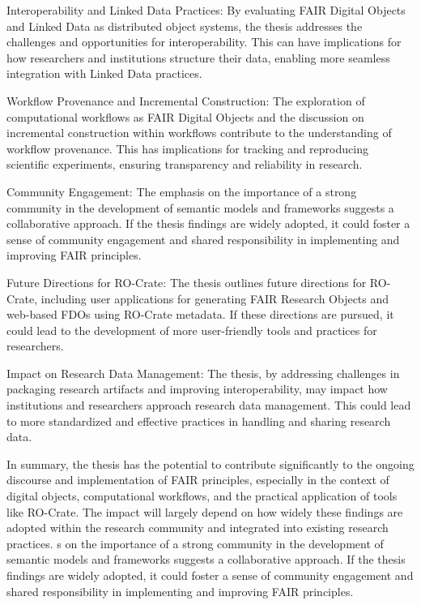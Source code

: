     Interoperability and Linked Data Practices: By evaluating FAIR Digital Objects and Linked Data as distributed object systems, the thesis addresses the challenges and opportunities for interoperability. This can have implications for how researchers and institutions structure their data, enabling more seamless integration with Linked Data practices.

    Workflow Provenance and Incremental Construction: The exploration of computational workflows as FAIR Digital Objects and the discussion on incremental construction within workflows contribute to the understanding of workflow provenance. This has implications for tracking and reproducing scientific experiments, ensuring transparency and reliability in research.

    Community Engagement: The emphasis on the importance of a strong community in the development of semantic models and frameworks suggests a collaborative approach. If the thesis findings are widely adopted, it could foster a sense of community engagement and shared responsibility in implementing and improving FAIR principles.

    Future Directions for RO-Crate: The thesis outlines future directions for RO-Crate, including user applications for generating FAIR Research Objects and web-based FDOs using RO-Crate metadata. If these directions are pursued, it could lead to the development of more user-friendly tools and practices for researchers.

    Impact on Research Data Management: The thesis, by addressing challenges in packaging research artifacts and improving interoperability, may impact how institutions and researchers approach research data management. This could lead to more standardized and effective practices in handling and sharing research data.

In summary, the thesis has the potential to contribute significantly to the ongoing discourse and implementation of FAIR principles, especially in the context of digital objects, computational workflows, and the practical application of tools like RO-Crate. The impact will largely depend on how widely these findings are adopted within the research community and integrated into existing research practices.
s on the importance of a strong community in the development of semantic models and frameworks suggests a collaborative approach. If the thesis findings are widely adopted, it could foster a sense of community engagement and shared responsibility in implementing and improving FAIR principles.

